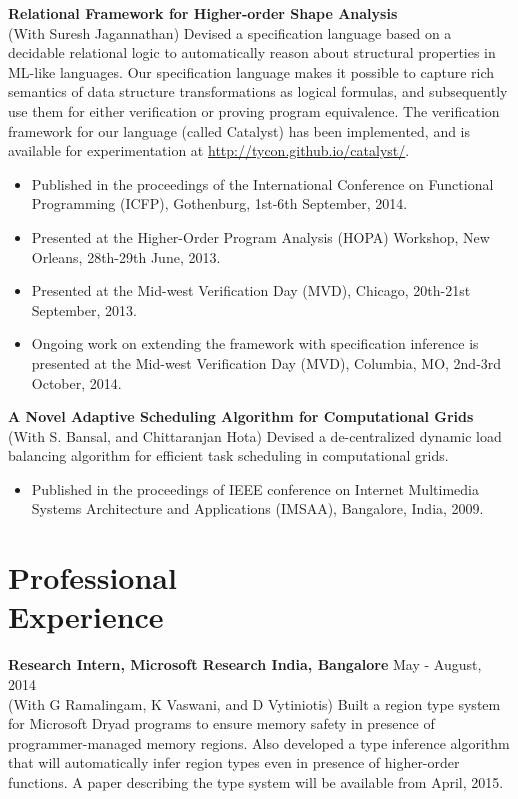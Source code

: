 \documentclass[margin,line]{res}
\begin{document}
\begin{resume}
 {\bf Relational Framework for Higher-order Shape Analysis} \\
 (With Suresh Jagannathan) Devised a specification language based on a
 decidable relational logic to automatically reason about structural
 properties in ML-like languages. Our specification language makes it
 possible to capture rich semantics of data structure transformations
 as logical formulas, and subsequently use them for either
 verification or proving program equivalence. The verification
 framework for our language (called {\sc Catalyst}) has been
 implemented, and is available for experimentation at
 \url{http://tycon.github.io/catalyst/}.
 \begin{itemize} \itemsep -2pt  %
 \item Published in the proceedings of the International Conference on
 Functional Programming (ICFP), Gothenburg, 1st-6th September, 2014.
 \item Presented at the Higher-Order Program Analysis (HOPA) Workshop,
 New Orleans, 28th-29th June, 2013.
 \item Presented at the Mid-west Verification Day (MVD), Chicago,
 20th-21st September, 2013.
 \item Ongoing work on extending the framework with specification
 inference is presented at the Mid-west Verification Day (MVD),
 Columbia, MO, 2nd-3rd October, 2014.
 \end{itemize}

{\bf A Novel Adaptive Scheduling Algorithm for Computational Grids}\\
(With S. Bansal, and Chittaranjan Hota) Devised a de-centralized
dynamic load balancing algorithm for efficient task scheduling in
computational grids.
 \begin{itemize} \itemsep -2pt  %
 \item Published in the proceedings of IEEE conference on Internet
 Multimedia Systems Architecture and Applications (IMSAA), Bangalore,
 India, 2009.
 \end{itemize}

\section{Professional \\ Experience}

{\bf Research Intern, Microsoft Research India, Bangalore} \hfill May - August, 2014\\
(With G Ramalingam, K Vaswani, and D Vytiniotis) Built a region type
system for Microsoft Dryad programs to ensure memory safety in
presence of programmer-managed memory regions. Also developed a type
inference algorithm that will automatically infer region types even in
presence of higher-order functions. A paper describing the type system
will be available from April, 2015.


\end{resume}
\end{document}
